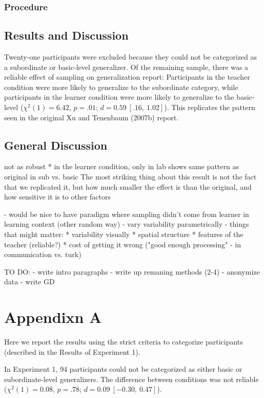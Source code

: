 \documentclass[man]{apa2}
\begin{document}
\subsubsection{Procedure}

\subsection{Results and Discussion}


Twenty-one participants were excluded because they could not be categorized as a subordinate or basic-level generalizer. Of the remaining sample, there was a reliable effect of sampling on generalization report: Participants in the teacher condition were more likely to generalize to the subordinate category, while participants in the learner condition were more likely to generalize to the basic-level ($\chi^2(1) = 6.42$,  $p = .01$; $d = 0.59\ [.16,\ 1.02]$). This replicates the pattern seen in the original Xu and Tenenbaum (2007b) report.

\subsection{General Discussion}
not as robust
* in the learner condition, only in lab shows same pattern as original in sub vs. basic
The most striking thing about this result is not the fact that we replicated it, but how much smaller the effect is than the original, and how sensitive it is to other factors

- would be nice to have paradigm where sampling didn't come from learner in learning context (other random way)
- vary variability parametrically
- things that might matter:
* variability visually
* spatial structure
* features of the teacher (reliable?)
* cost of getting it wrong ("good enough processing" - in communication vs. turk)

TO DO:
- write intro paragraphs
- write up remaning methods (2-4)
- anonymize data
- write GD

\section{Appendixn A}

Here we report the results using the strict criteria to categorize participants (described in the Results of Experiment 1).

In Experiment 1, 94 participants could not be categorized as either basic or subordinate-level generalizers. The difference between conditions was not reliable ($\chi^2(1) = 0.08$,  $p = .78$; $d = 0.09\ [-0.30,\ 0.47]$).
\end{document}
